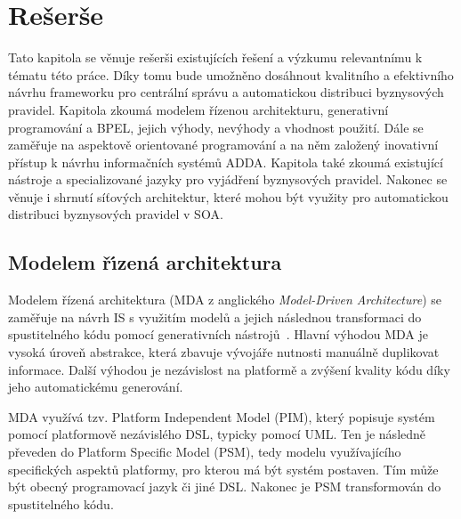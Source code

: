 
\chapter{Rešerše}\label{ch:reserse}

Tato kapitola se věnuje rešerši existujících řešení
a výzkumu relevantnímu k tématu této práce. Díky tomu bude umožněno
dosáhnout kvalitního a efektivního návrhu frameworku pro centrální správu a automatickou
distribuci byznysových pravidel.
Kapitola zkoumá modelem řízenou architekturu, generativní
programování a BPEL, jejich výhody, nevýhody a vhodnost použití.
Dále se zaměřuje na aspektově orientované programování
a na něm založený inovativní přístup k návrhu informačních systémů \gls{ADDA}.
Kapitola také zkoumá existující nástroje a specializované jazyky pro vyjádření
byznysových pravidel.
Nakonec se věnuje i shrnutí síťových architektur, které mohou být využity
pro automatickou distribuci byznysových pravidel v \gls{SOA}.

\section{Modelem ř\'{\i}zená architektura}

Modelem řízená architektura (\gls{MDA} z anglického \textit{Model-Driven
Architecture}) se zaměřuje na návrh \gls{IS} s využitím modelů a jejich
následnou transformaci do spustitelného kódu pomocí generativních nástrojů~\cite{soley2000model}.
Hlavní výhodou \gls{MDA} je vysoká úroveň abstrakce, která zbavuje vývojáře nutnosti
manuálně duplikovat informace. Další výhodou je nezávislost na platformě a zvýšení
kvality kódu díky jeho automatickému generování.


\gls{MDA} využívá tzv. Platform Independent Model (\gls{PIM}),
který popisuje systém pomocí platformově nezávislého \gls{DSL},
typicky pomocí \gls{UML}. Ten je následně převeden do
Platform Specific Model (\gls{PSM}), tedy modelu využívajícího
specifických aspektů platformy, pro kterou má být systém postaven.
Tím může být obecný programovací jazyk či jiné \gls{DSL}.
Nakonec je \gls{PSM} transformován do spustitelného kódu.

